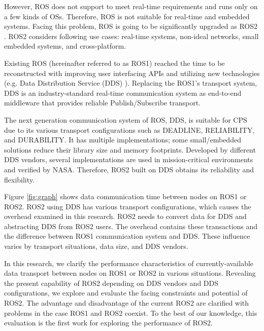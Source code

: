 \documentclass{sig-alternate-ipsn13}
\begin{document}
However, ROS does not support to meet real-time requirements and runs only on a few kinds of OSs. Therefore, ROS is not suitable for real-time and embedded systems. Facing this problem, ROS is going to be significantly upgraded as ROS2 \cite{ros2_iccps2016}. ROS2 considers following use cases: real-time systems, non-ideal networks, small embedded systems, and cross-platform.

Existing ROS (hereinafter referred to as ROS1) reached the time to be reconstructed with improving user interfacing APIs and utilizing new technologies (e.g. Data Distribution Service (DDS) \cite{pardo2003omg}). Replacing the ROS1's transport system, DDS is an industry-standard real-time communication system as end-to-end middleware that provides reliable Publish/Subscribe transport.

The next generation communication system of ROS, DDS, is suitable for CPS due to its various transport configurations such as DEADLINE, RELIABILITY, and DURABILITY. It has multiple implementations; some small/embedded solutions reduce their library size and memory footprints. Developed by different DDS vendors, several implementations are used in mission-critical environments and verified by NASA. Therefore, ROS2 built on DDS obtains its reliability and flexibility.

Figure \ref{fig:graph} shows data communication time between nodes on ROS1 or ROS2. ROS2 using DDS has various transport configurations, which causes the overhead examined in this research. ROS2 needs to convert data for DDS and abstracting DDS from ROS2 users. The overhead contains these transactions and the difference between ROS1 communication system and DDS. These influence varies by transport situations, data size, and DDS vendors.

In this research, we clarify the performance characteristics of currently-available data transport between nodes on ROS1 or ROS2 in various situations. Revealing the present capability of ROS2 depending on DDS vendors and DDS configurations, we explore and evaluate the facing constraints and potential of ROS2. The advantage and disadvantage of the current ROS2 are clarified with problems in the case ROS1 and ROS2 coexist. To the best of our knowledge, this evaluation is the first work for exploring the performance of ROS2.

\end{document}
